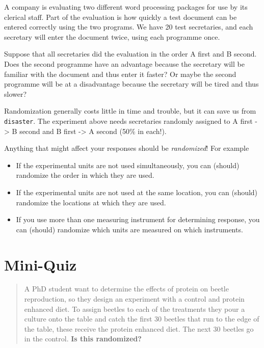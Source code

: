 \documentclass[
]{book}
\providecommand{\tightlist}{%
  \setlength{\itemsep}{0pt}\setlength{\parskip}{0pt}}
\begin{document}
A company is evaluating two different word processing packages for use by its clerical staff. Part of the evaluation is how quickly a test document can be entered correctly using the two programs. We have 20 test secretaries, and each secretary will enter the document twice, using each programme once.

Suppose that all secretaries did the evaluation in the order A first and B second. Does the second programme have an advantage because the secretary will be familiar with the document and thus enter it faster? Or maybe the second programme will be at a disadvantage because the secretary will be tired and thus slower?

Randomization generally costs little in time and trouble, but it can save us from \texttt{disaster}. The experiment above needs secretaries randomly assigned to A first -\textgreater{} B second and B first -\textgreater{} A second (50\% in each!).

Anything that might affect your responses should be \emph{randomized}! For example

\begin{itemize}
\tightlist
\item
  If the experimental units are not used simultaneously, you can (should) randomize the order in which they are used.
\item
  If the experimental units are not used at the same location, you can (should) randomize the locations at which they are used.
\item
  If you use more than one measuring instrument for determining response, you can (should) randomize which units are measured on which instruments.
\end{itemize}

\hypertarget{mini-quiz}{%
\section{Mini-Quiz}\label{mini-quiz}}

\begin{quote}
A PhD student want to determine the effects of protein on beetle reproduction, so they design an experiment with a control and protein enhanced diet. To assign beetles to each of the treatments they pour a culture onto the table and catch the first 30 beetles that run to the edge of the table, these receive the protein enhanced diet. The next 30 beetles go in the control. \textbf{Is this randomized?}
\end{quote}
\end{document}
